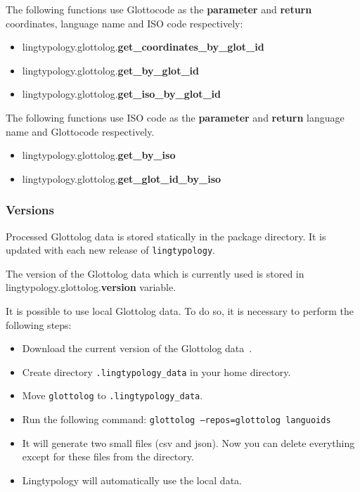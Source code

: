 \documentclass[a4paper,12pt]{article}
\begin{document}
The following functions use Glottocode as the \textbf{parameter} and \textbf{return} coordinates, language name and ISO code respectively:
\begin{itemize}
 \item lingtypology.glottolog.\textbf{get\_coordinates\_by\_glot\_id}
 \item lingtypology.glottolog.\textbf{get\_by\_glot\_id}
 \item lingtypology.glottolog.\textbf{get\_iso\_by\_glot\_id}
\end{itemize}

The following functions use ISO code as the \textbf{parameter} and \textbf{return} language name and Glottocode respectively.
\begin{itemize}
 \item lingtypology.glottolog.\textbf{get\_by\_iso}
 \item lingtypology.glottolog.\textbf{get\_glot\_id\_by\_iso}
\end{itemize}

\subsubsection{Versions}

Processed Glottolog data is stored statically in the package directory. It is updated with each new release of \texttt{lingtypology}.

The version of the Glottolog data which is currently used is stored in lingtypology.glottolog.\textbf{version} variable.

It is possible to use local Glottolog data. To do so, it is necessary to perform the following steps:
\begin{itemize}
 \item Download the current version of the Glottolog data~\parencite{HaraldHammarstrom2019}.
 \item Create directory \texttt{.lingtypology\_data} in your home directory.
 \item Move \texttt{glottolog} to \texttt{.lingtypology\_data}.
 \item Run the following command: \texttt{glottolog --repos=glottolog languoids}
 \item It will generate two small files (csv and json). Now you can delete everything except for these files from the directory.
 \item Lingtypology will automatically use the local data.
\end{itemize}
\end{document}
